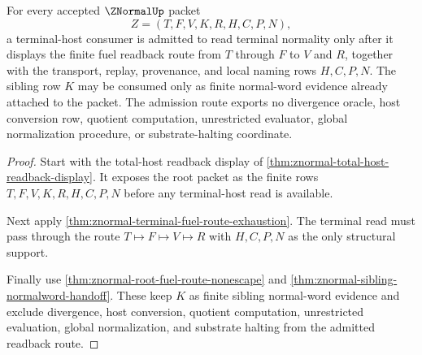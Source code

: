 \begin{theorem}
\label{thm:znormal-terminal-fuel-readback-admission}
For every accepted $\ZNormalUp$ packet
$$
Z=(T,F,V,K,R,H,C,P,N),
$$
a terminal-host consumer is admitted to read terminal normality only after it displays the finite fuel readback route from $T$ through $F$ to $V$ and $R$, together with the transport, replay, provenance, and local naming rows $H,C,P,N$. The sibling row $K$ may be consumed only as finite normal-word evidence already attached to the packet. The admission route exports no divergence oracle, host conversion row, quotient computation, unrestricted evaluator, global normalization procedure, or substrate-halting coordinate.
\end{theorem}
\begin{proof}
Start with the total-host readback display of \autoref{thm:znormal-total-host-readback-display}. It exposes the root packet as the finite rows $T,F,V,K,R,H,C,P,N$ before any terminal-host read is available.

Next apply \autoref{thm:znormal-terminal-fuel-route-exhaustion}. The terminal read must pass through the route $T \longmapsto F \longmapsto V \longmapsto R$ with $H,C,P,N$ as the only structural support.

Finally use \autoref{thm:znormal-root-fuel-route-nonescape} and \autoref{thm:znormal-sibling-normalword-handoff}. These keep $K$ as finite sibling normal-word evidence and exclude divergence, host conversion, quotient computation, unrestricted evaluation, global normalization, and substrate halting from the admitted readback route.
\end{proof}

